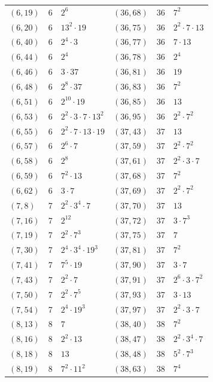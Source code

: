 \documentclass[11pt]{article}
\begin{document}
\begin{longtable}{@{}lrl@{\qquad}lrl@{}}
$(6,19)$ & 6 & $2^{6}$ & $(36,68)$ & 36 & $7^{2}$\\
$(6,20)$ & 6 & $13^{2}\cdot 19$ & $(36,75)$ & 36 & $2^{2}\cdot 7\cdot 13$\\
$(6,40)$ & 6 & $2^{4}\cdot 3$ & $(36,77)$ & 36 & $7\cdot 13$\\
$(6,44)$ & 6 & $2^{4}$ & $(36,78)$ & 36 & $2^{4}$\\
$(6,46)$ & 6 & $3\cdot 37$ & $(36,81)$ & 36 & $19$\\
$(6,48)$ & 6 & $2^{8}\cdot 37$ & $(36,83)$ & 36 & $7^{2}$\\
$(6,51)$ & 6 & $2^{10}\cdot 19$ & $(36,85)$ & 36 & $13$\\
$(6,53)$ & 6 & $2^{2}\cdot 3\cdot 7\cdot 13^{2}$ & $(36,95)$ & 36 & $2^{2}\cdot 7^{2}$\\
$(6,55)$ & 6 & $2^{2}\cdot 7\cdot 13\cdot 19$ & $(37,43)$ & 37 & $13$\\
$(6,57)$ & 6 & $2^{6}\cdot 7$ & $(37,59)$ & 37 & $2^{2}\cdot 7^{2}$\\
$(6,58)$ & 6 & $2^{8}$ & $(37,61)$ & 37 & $2^{2}\cdot 3\cdot 7$\\
$(6,59)$ & 6 & $7^{2}\cdot 13$ & $(37,68)$ & 37 & $7^{2}$\\
$(6,62)$ & 6 & $3\cdot 7$ & $(37,69)$ & 37 & $2^{2}\cdot 7^{2}$\\
$(7,8)$ & 7 & $2^{2}\cdot 3^{4}\cdot 7$ & $(37,70)$ & 37 & $13$\\
$(7,16)$ & 7 & $2^{12}$ & $(37,72)$ & 37 & $3\cdot 7^{3}$\\
$(7,19)$ & 7 & $2^{2}\cdot 7^{3}$ & $(37,75)$ & 37 & $7$\\
$(7,30)$ & 7 & $2^{4}\cdot 3^{4}\cdot 19^{3}$ & $(37,81)$ & 37 & $7^{2}$\\
$(7,41)$ & 7 & $7^{5}\cdot 19$ & $(37,90)$ & 37 & $3\cdot 7$\\
$(7,43)$ & 7 & $2^{2}\cdot 7$ & $(37,91)$ & 37 & $2^{6}\cdot 3\cdot 7^{2}$\\
$(7,50)$ & 7 & $2^{2}\cdot 7^{5}$ & $(37,93)$ & 37 & $3\cdot 13$\\
$(7,54)$ & 7 & $2^{4}\cdot 19^{3}$ & $(37,97)$ & 37 & $2^{2}\cdot 3\cdot 7$\\
$(8,13)$ & 8 & $7$ & $(38,40)$ & 38 & $7^{2}$\\
$(8,16)$ & 8 & $2^{2}\cdot 13$ & $(38,47)$ & 38 & $2^{2}\cdot 3^{4}\cdot 7$\\
$(8,18)$ & 8 & $13$ & $(38,48)$ & 38 & $5^{2}\cdot 7^{3}$\\
$(8,19)$ & 8 & $7^{2}\cdot 11^{2}$ & $(38,63)$ & 38 & $7^{4}$\\

\end{longtable}
\end{document}
